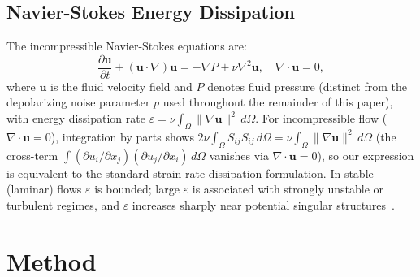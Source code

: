 \documentclass[10pt,letterpaper]{article}
\begin{document}
\subsection{Navier-Stokes Energy Dissipation}
The incompressible Navier-Stokes equations are:
\begin{equation}
  \frac{\partial \mathbf{u}}{\partial t}
    + (\mathbf{u}\!\cdot\!\nabla)\mathbf{u}
  = -\nabla P + \nu\nabla^{2}\mathbf{u},\quad
  \nabla\cdot\mathbf{u}=0,
\end{equation}
where $\mathbf{u}$ is the fluid velocity field and $P$ denotes fluid pressure
(distinct from the depolarizing noise
parameter $p$ used throughout the remainder of this paper),
with energy dissipation rate
$\varepsilon = \nu\int_{\Omega}\|\nabla\mathbf{u}\|^{2}\,d\Omega$.
For incompressible flow ($\nabla\cdot\mathbf{u}=0$), integration by
parts shows $2\nu\int_\Omega S_{ij}S_{ij}\,d\Omega =
\nu\int_\Omega\|\nabla\mathbf{u}\|^2\,d\Omega$ (the cross-term
$\int(\partial u_i/\partial x_j)(\partial u_j/\partial x_i)\,d\Omega$
vanishes via $\nabla\cdot\mathbf{u}=0$), so our expression is
equivalent to the standard strain-rate dissipation formulation.
In stable (laminar) flows $\varepsilon$ is bounded; large $\varepsilon$
is associated with strongly unstable or turbulent regimes, and
$\varepsilon$ increases sharply near potential singular
structures~\cite{Tao2016,Wang2025}.

\section{Method}
\end{document}
